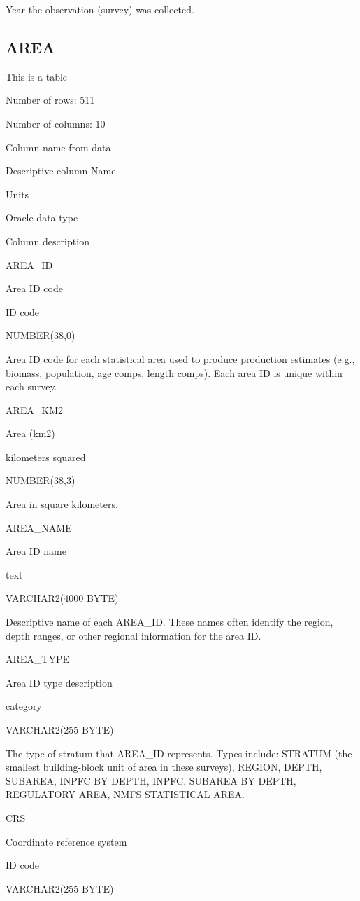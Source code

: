 \documentclass[
  letterpaper,
  oneside,
  open=any]{scrbook}
\begin{document}
Year the observation (survey) was collected.

\hypertarget{area}{%
\subsection{AREA}\label{area}}

This is a table

Number of rows: 511

Number of columns: 10

Column name from data

Descriptive column Name

Units

Oracle data type

Column description

AREA\_ID

Area ID code

ID code

NUMBER(38,0)

Area ID code for each statistical area used to produce production
estimates (e.g., biomass, population, age comps, length comps). Each
area ID is unique within each survey.

AREA\_KM2

Area (km2)

kilometers squared

NUMBER(38,3)

Area in square kilometers.

AREA\_NAME

Area ID name

text

VARCHAR2(4000 BYTE)

Descriptive name of each AREA\_ID. These names often identify the
region, depth ranges, or other regional information for the area ID.

AREA\_TYPE

Area ID type description

category

VARCHAR2(255 BYTE)

The type of stratum that AREA\_ID represents. Types include: STRATUM
(the smallest building-block unit of area in these surveys), REGION,
DEPTH, SUBAREA, INPFC BY DEPTH, INPFC, SUBAREA BY DEPTH, REGULATORY
AREA, NMFS STATISTICAL AREA.

CRS

Coordinate reference system

ID code

VARCHAR2(255 BYTE)
\end{document}
